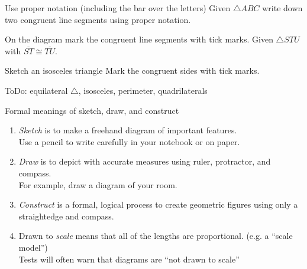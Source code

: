 \begin{frame}{Use proper notation (including the bar over the letters)}
      Given $\triangle ABC$ write down two congruent line segments using proper notation.\\
      \end{frame}

\begin{frame}{On the diagram mark the congruent line segments with tick marks.}
      Given $\triangle STU$ with $\overline{ST} \cong \overline{TU}$. 
      \begin{center}
      \end{center}
    \end{frame}

\begin{frame}{ Sketch an isosceles triangle}
  Mark the congruent sides with tick marks.\par \vspace{4cm}
  ToDo: equilateral $\triangle$, isosceles, perimeter, quadrilaterals
\end{frame}

\begin{frame}{Formal meanings of sketch, draw, and construct}
  \begin{enumerate}
    \item \emph{Sketch} is to make a freehand diagram of important features. \\[0.15cm]
    Use a pencil to write carefully in your notebook or on paper.  \smallskip
    \item \emph{Draw}  is to depict with accurate measures using ruler, protractor, and compass.\\[0.15cm]
    For example, draw a diagram of your room. \smallskip
    \item \emph{Construct} is a formal, logical process to create geometric figures using only a straightedge and compass. \smallskip
    \item Drawn to \emph{scale} means that all of the lengths are proportional. (e.g. a ``scale model'')\\[0.15cm]
    Tests will often warn that diagrams are ``not drawn to scale''
  \end{enumerate}
\end{frame}

